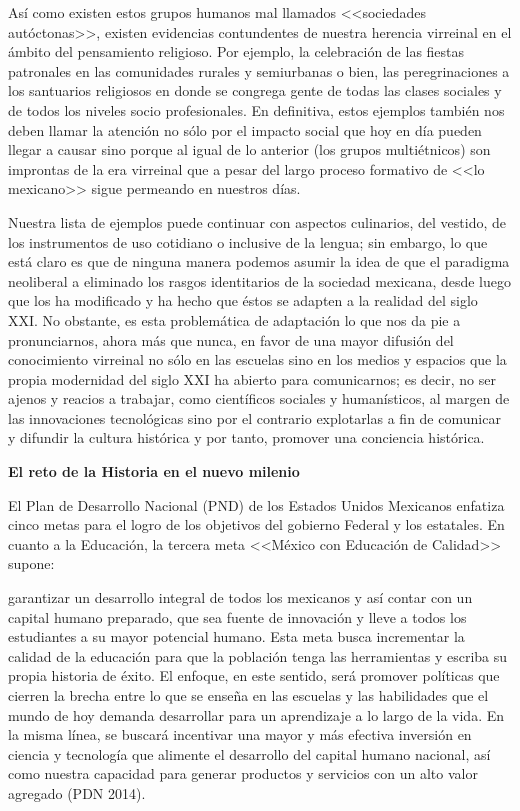 Así como existen estos grupos humanos mal llamados <<sociedades autóctonas>>,
existen evidencias contundentes de nuestra herencia virreinal en el ámbito del
pensamiento religioso. Por ejemplo, la celebración de las fiestas patronales en
las comunidades rurales y semiurbanas o bien, las peregrinaciones a los
santuarios religiosos en donde se congrega gente de todas las clases sociales y
de todos los niveles socio profesionales. En definitiva, estos ejemplos también
nos deben llamar la atención no sólo por el impacto social que hoy en día
pueden llegar a causar sino porque al igual de lo anterior (los grupos
multiétnicos) son improntas de la era virreinal que a pesar del largo proceso
formativo de <<lo mexicano>> sigue permeando en nuestros días.

Nuestra lista de ejemplos puede continuar con aspectos culinarios, del vestido,
de los instrumentos de uso cotidiano o inclusive de la lengua; sin embargo, lo
que está claro es que de ninguna manera podemos asumir la idea de que el
paradigma neoliberal a eliminado los rasgos identitarios de la sociedad
mexicana, desde luego que los ha modificado y ha hecho que éstos se adapten a
la realidad del siglo XXI. No obstante, es esta problemática de adaptación lo
que nos da pie a pronunciarnos, ahora más que nunca, en favor de una mayor
difusión del conocimiento virreinal no sólo en las escuelas sino en los medios
y espacios que la propia modernidad del siglo XXI ha abierto para comunicarnos;
es decir, no ser ajenos y reacios a trabajar, como científicos sociales y
humanísticos, al margen de las innovaciones tecnológicas sino por el contrario
explotarlas a fin de comunicar y difundir la cultura histórica y por tanto,
promover una conciencia histórica. 


\bigskip
\textbf{El reto de la Historia en el nuevo milenio}


El Plan de Desarrollo Nacional  (PND) de los Estados Unidos Mexicanos enfatiza
cinco metas para el logro de los objetivos del gobierno Federal y los
estatales. En cuanto a la Educación, la tercera meta <<México con Educación de
Calidad>> supone:


garantizar un desarrollo integral de todos los mexicanos y así contar con un
capital humano preparado, que sea fuente de innovación y lleve a todos los
estudiantes a su mayor potencial humano. Esta meta busca incrementar la calidad
de la educación para que la población tenga las herramientas y escriba su
propia historia de éxito. El enfoque, en este sentido, será promover políticas
que cierren la brecha entre lo que se enseña en las escuelas y las habilidades
que el mundo de hoy demanda desarrollar para un aprendizaje a lo largo de la
vida. En la misma línea, se buscará incentivar una mayor y más efectiva
inversión en ciencia y tecnología que alimente el desarrollo del capital humano
nacional, así como nuestra capacidad para generar productos y servicios con un
alto valor agregado (PDN 2014).


